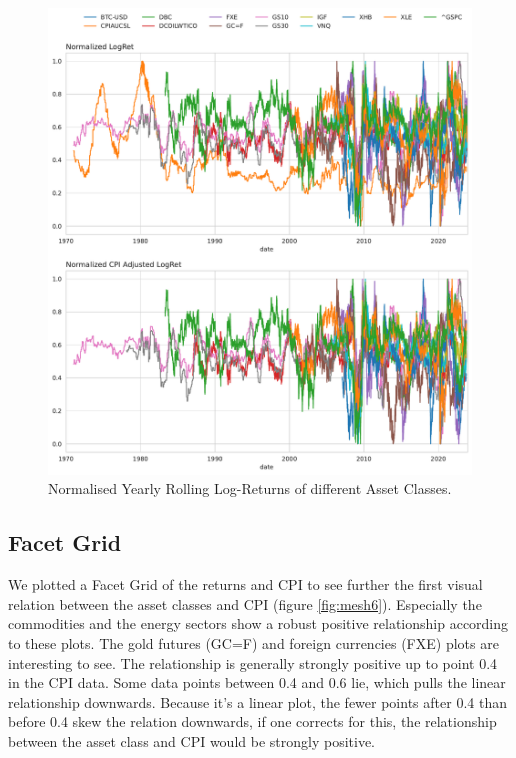 \documentclass{article}
\begin{document}
\begin{figure}
    \centering
    \includegraphics[width=1\textwidth]{figure/Normalized_Returns.pdf}
    \caption{Normalised Yearly Rolling Log-Returns of different Asset Classes.}
    \label{fig:mesh2}
\end{figure}

\subsection{Facet Grid}

We plotted a Facet Grid of the returns and CPI to see further the first visual relation between the asset classes and CPI (figure \ref{fig:mesh6}). Especially the commodities and the energy sectors show a robust positive relationship according to these plots. The gold futures (GC=F) and foreign currencies (FXE) plots are interesting to see. The relationship is generally strongly positive up to point 0.4 in the CPI data. Some data points between 0.4 and 0.6 lie, which pulls the linear relationship downwards. Because it's a linear plot, the fewer points after 0.4 than before 0.4 skew the relation downwards, if one corrects for this, the relationship between the asset class and CPI would be strongly positive.
\end{document}
